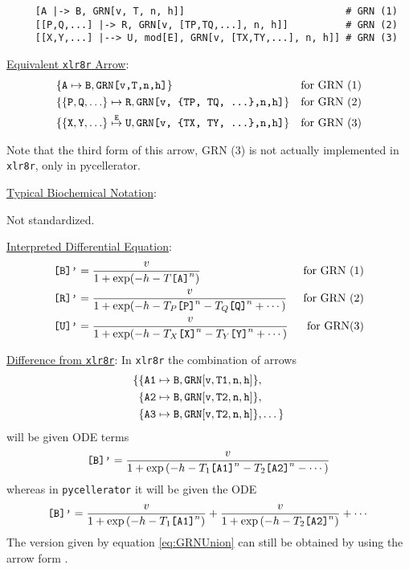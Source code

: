\begin{lstlisting}
     [A |-> B, GRN[v, T, n, h]]                            # GRN (1)
     [[P,Q,...] |-> R, GRN[v, [TP,TQ,...], n, h]]          # GRN (2)
     [[X,Y,...] |--> U, mod[E], GRN[v, [TX,TY,...], n, h]] # GRN (3)
\end{lstlisting}

\underline{Equivalent {\tt xlr8r} Arrow}: 
\begin{align*}
& \{{\tt A} \mapsto {\tt B}, \text{\tt GRN[v,T,n,h]}\} & \text{for GRN (1)}\\
& \{\{{\tt P, Q, \dots}\} \mapsto {\tt R}, \text{\tt GRN[v, \{TP, TQ, \dots\},n,h]}\} & \text{for GRN (2)}\\
& \{\{{\tt X, Y, \dots }\} \overset{\tt E}{\mapsto} {\tt U}, \text{\tt GRN[v,  \{TX, TY, \dots\},n,h]}\} & \text{for GRN (3)}\\
\end{align*}

Note that the third form of this arrow, GRN (3) is not actually implemented in {\tt xlr8r}, only in pycellerator.


\underline{Typical Biochemical Notation}: 

Not standardized.

\underline{Interpreted Differential Equation}:
\begin{align}
\text{\tt[B]'} &= \dfrac{v}{1+\exp(-h-T\text{\tt [A]}^n)} & \text{for GRN (1)}\\
\text{\tt[R]'} &= \dfrac{v}{1+\exp(-h-T_P \text{\tt [P]}^n - T_Q \text{\tt [Q]}^n + \cdots )} &\text{ for GRN (2)}\\
\text{\tt[U]'} &= \dfrac{v}{1+\exp(-h-T_X \text{\tt [X]}^n - T_Y \text{\tt [Y]}^n + \cdots )} &\text{ for GRN(3)}
\end{align}

\underline{Difference from {\tt xlr8r}}: In {\tt xlr8r} the combination of arrows
\begin{equation}
\begin{split}
\{ & \{ {\tt A1} \mapsto {\tt B}, {\tt GRN[v, T1, n, h]}\}, \\
   & \{ {\tt A2} \mapsto {\tt B}, {\tt GRN[v, T2, n, h]}\}, \\
   & \{ {\tt A3} \mapsto {\tt B}, {\tt GRN[v, T2, n, h]}\},    
   \dots \}
\end{split}
\end{equation}
will be given ODE terms
\begin{equation}\label{eq:GRNUnion}
\text{\tt [B]'} = \dfrac{v}{1+\exp\left(-h - T_1 \text{\tt [A1]}^n - T_2 \text{\tt [A2]}^n - \cdots \right)}
\end{equation}
whereas in {\tt pycellerator} it will be given the ODE
\begin{equation*}
\text{\tt [B]'} = \dfrac{v}{1+\exp\left(-h - T_1 \text{\tt [A1]}^n  \right)}
+  \dfrac{v}{1+\exp\left(-h - T_2 \text{\tt [A2]}^n  \right)} + \cdots 
\end{equation*}
The version given by equation \eqref{eq:GRNUnion} can still be obtained by using the arrow form \CODE{[[A1,A2,..]|-->B]}.


